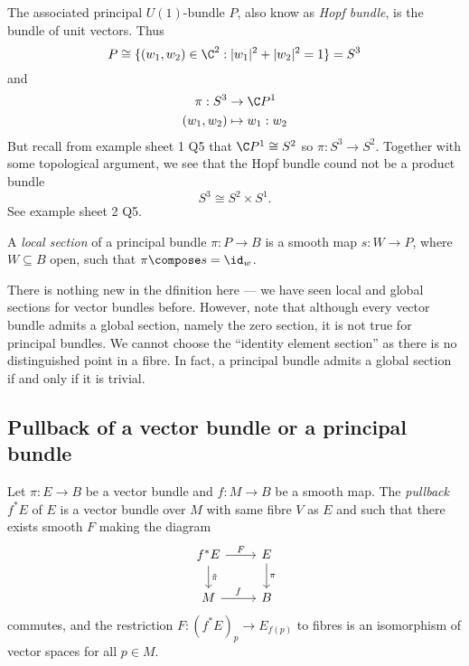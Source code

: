 \documentclass[a4paper]{article}
\begin{document}
The associated principal \(U(1)\)-bundle \(P\), also know as \emph{Hopf bundle}, is the bundle of unit vectors. Thus
\[
  P \cong \{(w_1, w_2) \in \C^2: |w_1|^2 + |w_2|^2 = 1\} = S^3
\]
and
\begin{align*}
  \pi: S^3 &\to \C P^1 \\
  (w_1, w_2) &\mapsto w_1 : w_2
\end{align*}
But recall from example sheet 1 Q5 that \(\C P^1 \cong S^2\) so \(\pi: S^3 \to S^2\). Together with some topological argument, we see that the Hopf bundle cound not be a product bundle
\[
  S^3 \cong S^2 \times S^1.
\]
See example sheet 2 Q5.

\begin{definition}
  A \emph{local section} of a principal bundle \(\pi: P \to B\) is a smooth map \(s: W \to P\), where \(W \subseteq B\) open, such that \(\pi \compose s = \id_w\).
\end{definition}

There is nothing new in the dfinition here --- we have seen local and global sections for vector bundles before. However, note that although every vector bundle admits a global section, namely the zero section, it is not true for principal bundles. We cannot choose the ``identity element section'' as there is no distinguished point in a fibre. In fact, a principal bundle admits a global section if and only if it is trivial.

\subsection{Pullback of a vector bundle or a principal bundle}

\begin{definition}
  Let \(\pi: E \to B\) be a vector bundle and \(f: M \to B\) be a smooth map. The \emph{pullback} \(f^*E\) of \(E\) is a vector bundle over \(M\) with same fibre \(V\) as \(E\) and such that there exists smooth \(F\) making the diagram
  \[
    \begin{tikzcd}
      f^*E \ar[r, "F"] \ar[d, "\tilde \pi"] & E \ar[d, "\pi"] \\
      M \ar[r, "f"] & B
    \end{tikzcd}
  \]
  commutes, and the restriction \(F: (f^*E)_p \to E_{f(p)}\) to fibres is an isomorphism of vector spaces for all \(p \in M\).
\end{definition}
\end{document}
